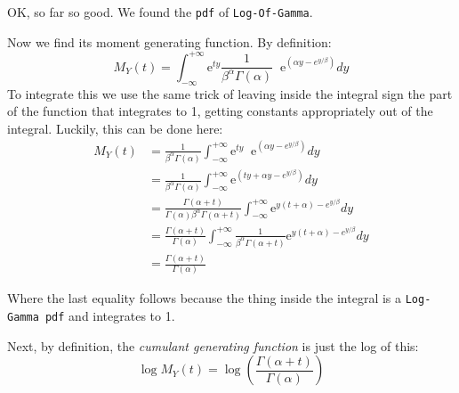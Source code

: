 \documentclass[12pt]{article}
\begin{document}
OK, so far so good. We found the \texttt{pdf} of \texttt{Log-Of-Gamma}. 

Now we find its moment generating function. By definition:
$$
M_Y(t) = \int_{-\infty}^{+\infty} \mathrm{e}^{ty} \frac{1}{\beta^\alpha \Gamma(\alpha)} \;\; \mathrm{e}^{\left(\alpha y - e^{y/\beta}\right)} dy
$$
To integrate this we use the same trick of leaving inside the integral sign the part of the function that integrates to 1, getting constants appropriately out of the integral. Luckily, this can be done here:
\begin{align*}
M_Y(t) &= \frac{1}{\beta^\alpha \Gamma(\alpha)} \int_{-\infty}^{+\infty} \mathrm{e}^{ty} \;\; \mathrm{e}^{\left(\alpha y - e^{y/\beta}\right)} dy\\
&= \frac{1}{\beta^\alpha \Gamma(\alpha)} \int_{-\infty}^{+\infty} \mathrm{e}^{\left(ty +\alpha y - e^{y/\beta}\right)} dy\\
&= \frac{\Gamma(\alpha + t)}{\Gamma(\alpha) \beta^\alpha \Gamma(\alpha + t)} \int_{-\infty}^{+\infty} \mathrm{e}^{y \left(t +\alpha \right) - e^{y/\beta}} dy\\
&= \frac{\Gamma(\alpha + t)}{\Gamma(\alpha)}  \int_{-\infty}^{+\infty} \frac{1} {\beta^\alpha \Gamma(\alpha + t)}\mathrm{e}^{y \left(t +\alpha \right) - e^{y/\beta}} dy\\
&= \frac{\Gamma(\alpha + t)}{\Gamma(\alpha)} 
\end{align*}

Where the last equality follows because the thing inside the integral is a \texttt{Log-Gamma pdf} and integrates to 1.

Next, by definition, the \emph{cumulant generating function} is just the log of this:
$$
\log M_Y(t) = \log \left(\frac{\Gamma(\alpha + t)}{\Gamma(\alpha)} \right)
$$
\end{document}
